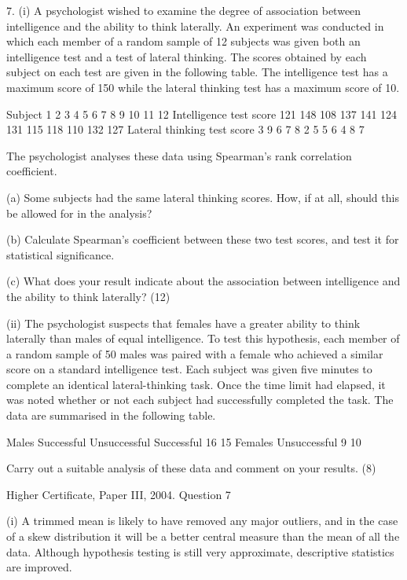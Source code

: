 \documentclass[a4paper,12pt]{article}
\begin{document}
\begin{framed} 
 
7. (i) A psychologist wished to examine the degree of association between intelligence and the ability to think laterally.  An experiment was conducted in which each member of a random sample of 12 subjects was given both an intelligence test and a test of lateral thinking.  The scores obtained by each subject on each test are given in the following table.  The intelligence test has a maximum score of 150 while the lateral thinking test has a maximum score of 10. 
 
Subject 1 2 3 4 5 6 7 8 9 10 11 12 Intelligence test score 121 148 108 137 141 124 131 115 118 110 132 127 Lateral thinking test score 3 9 6 7 8 2 5 5 6 4 8 7 
 
The psychologist analyses these data using Spearman's rank correlation coefficient. 
 
(a) Some subjects had the same lateral thinking scores.  How, if at all, should this be allowed for in the analysis? 
 
(b) Calculate Spearman's coefficient between these two test scores, and test it for statistical significance. 
 
(c) What does your result indicate about the association between intelligence and the ability to think laterally? (12) 
 
 
 (ii) The psychologist suspects that females have a greater ability to think laterally than males of equal intelligence.  To test this hypothesis, each member of a random sample of 50 males was paired with a female who achieved a similar score on a standard intelligence test.  Each subject was given five minutes to complete an identical lateral-thinking task.  Once the time limit had elapsed, it was noted whether or not each subject had successfully completed the task.  The data are summarised in the following table. 
 
  Males   Successful Unsuccessful Successful 16 15 Females Unsuccessful   9 10 
 
Carry out a suitable analysis of these data and comment on your results. 
(8) 
 
\end{framed}

Higher Certificate, Paper III, 2004.  Question 7 
 
 
(i) A trimmed mean is likely to have removed any major outliers, and in the case of a skew distribution it will be a better central measure than the mean of all the data.  Although hypothesis testing is still very approximate, descriptive statistics are improved. 
 
\end{document}
